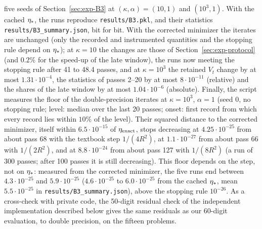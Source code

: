 five seeds of Section~\ref{sec:exp-B3} at $(\kappa,\alpha)=(10,1)$ and $(10^3,1)$. With the cached $\eta_\ast$, the
runs reproduce \nolinkurl{results/B3.pkl}, and their statistics \nolinkurl{results/B3_summary.json}, bit for bit. With
the corrected minimizer the iterates are unchanged (only the recorded and instrumented quantities and the stopping rule
depend on $\eta_\ast$); at $\kappa=10$ the changes are those of Section~\ref{sec:exp-protocol} (and $0.2\%$ for the
speed-up of the late window), the runs now meeting the stopping rule after 41 to 48.4 passes, and at $\kappa=10^3$ the
retained $V_t$ change by at most $1.31\cdot10^{-4}$, the statistics of passes 2--20 by at most $8\cdot10^{-11}$
(relative) and the shares of the late window by at most $1.04\cdot10^{-6}$ (absolute). Finally, the script measures the floor of the
double-precision iterates at $\kappa=10^3$, $\alpha=1$ (seed $0$, no stopping rule; level: median over the last 20
passes; onset: first record from which every record lies within $10\%$ of the level). Their squared distance to the
corrected minimizer, itself within $6.5\cdot10^{-15}$ of $\eta_{\rm exact}$, stops decreasing at $4.25\cdot10^{-25}$ from
about pass 68 with the textbook step $1/(4R^2)$, at $1.1\cdot10^{-27}$ from about pass 66 with $1/(2R^2)$, and at
$8.8\cdot10^{-24}$ from about pass 127 with $1/(8R^2)$ (a run of 300 passes; after 100 passes it is still decreasing).
This floor depends on the
step, not on $\eta_\ast$: measured from the corrected minimizer, the five runs end between $4.3\cdot10^{-25}$ and
$5.9\cdot10^{-25}$ ($4.6\cdot10^{-25}$ to $6.0\cdot10^{-25}$ from the cached $\eta_\ast$, mean $5.5\cdot10^{-25}$ in
\nolinkurl{results/B3_summary.json}), above the stopping rule $10^{-26}$. As a cross-check with private code, the
50-digit residual check of the independent implementation described below gives the same residuals as our 60-digit
evaluation, to double precision, on the fifteen problems.

